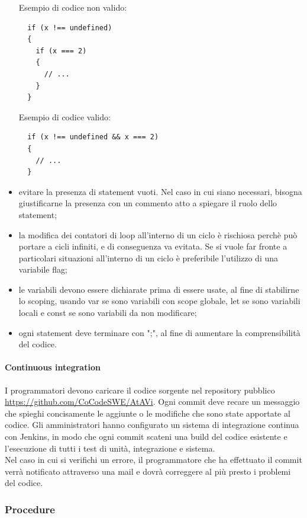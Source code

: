 \begin{itemize}
Esempio di codice non valido:
\begin{verbatim}
  if (x !== undefined)
  {
    if (x === 2)
    {
      // ...
    }
  }
\end{verbatim}
Esempio di codice valido:
\begin{verbatim}
  if (x !== undefined && x === 2)
  {
    // ...
  }
\end{verbatim}
	\item evitare la presenza di statement vuoti. Nel caso in cui siano necessari, bisogna giustificarne la presenza con un commento atto a spiegare il ruolo dello statement;

	\item la modifica dei contatori di loop all'interno di un ciclo è rischiosa perchè può portare a cicli infiniti, e di conseguenza va evitata. Se si vuole far fronte a particolari situazioni all'interno di un ciclo è preferibile l'utilizzo di una variabile flag;

	\item le variabili devono essere dichiarate prima di essere usate, al fine di stabilirne lo scoping, usando var se sono variabili con scope globale, let se sono variabili locali e const se sono variabili da non modificare;
	\item ogni statement deve terminare con ";", al fine di aumentare la comprensibilità del codice.

\end{itemize}

\paragraph{Continuous integration}\label{CI}
I programmatori devono caricare il codice sorgente nel repository pubblico \url{https://github.com/CoCodeSWE/AtAVi}.
Ogni commit deve recare un messaggio che spieghi concisamente le aggiunte o le modifiche che sono state apportate al codice. Gli amministratori hanno configurato un sistema di integrazione continua con Jenkins, in modo che ogni commit scateni
una build del codice esistente e l'esecuzione di tutti i test di unità, integrazione e sistema. \\
Nel caso in cui si verifichi un errore, il programmatore che ha effettuato il commit verrà notificato attraverso una mail e dovrà correggere al più presto i problemi del codice.

 \subsubsection{Procedure}
